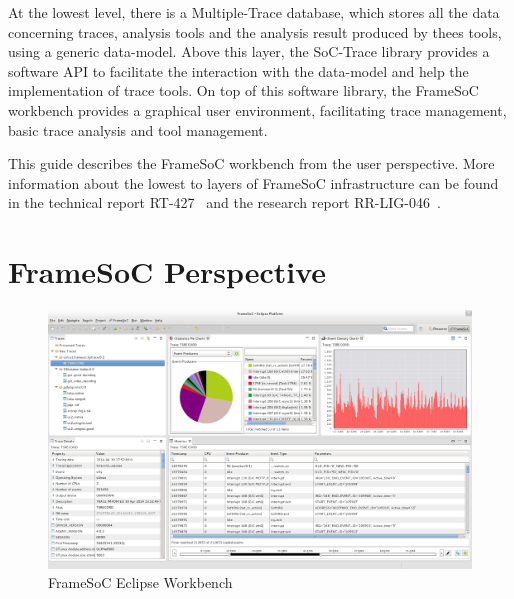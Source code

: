\documentclass[twoside]{article}
\begin{document}
\begin{sloppypar}
At the lowest level, there is a Multiple-Trace database, which stores all the data concerning traces, analysis tools and the analysis result produced by thees tools, using a generic data-model.
Above this layer, the SoC-Trace library provides a software API to facilitate the interaction with the data-model and help the implementation of trace tools.
On top of this software library, the FrameSoC workbench provides a graphical user environment, facilitating trace management, basic trace analysis and tool management.

This guide describes the FrameSoC workbench from the user perspective. 
More information about the lowest to layers of FrameSoC infrastructure can be found in the technical report RT-427~\cite{pagano:hal} and the research report RR-LIG-046~\cite{rrlig46}.

\newpage

\section{FrameSoC Perspective}
\label{sec:perspective}

\begin{figure}[h!]
  \centering
    \includegraphics[width=1.0\textwidth]{images/all_perspective_nocategory.png}
  \caption{FrameSoC Eclipse Workbench}
  \label{fig:all_perspective}
\end{figure}


\end{sloppypar}
\end{document}
